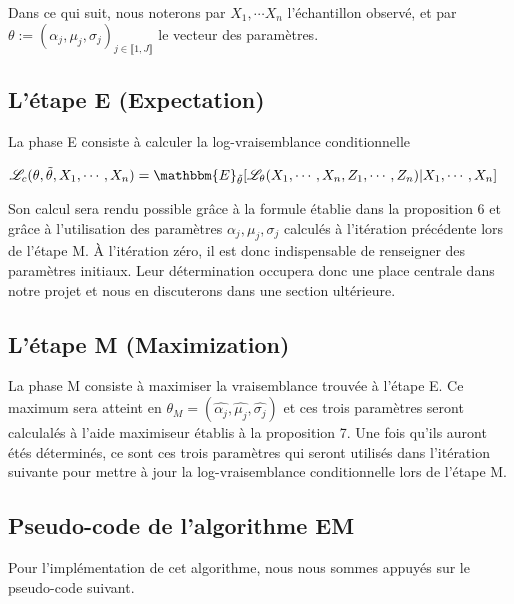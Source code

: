 \documentclass[frenchb]{report}
\newcommand{\1}{\mathbbm{1}}
\newcommand{\E}{\mathbbm{E}}
\newcommand{\lv}{\mathcal{L}}
\newcommand{\thetat}{\tilde{\theta}}
\theoremstyle{definition}\newtheorem{defn}{Définition}
\theoremstyle{definition}\newtheorem{exm}{Exemple}
\theoremstyle{definition}\newtheorem{nota}{Notation}
\theoremstyle{definition}\newtheorem{rem}{Remarque}
\begin{document}
Dans ce qui suit, nous noterons par $X_1,\cdots X_n$ l'échantillon observé, et par $\theta := (\alpha_j, \mu_j, \sigma_j)_{j\in\llbracket 1,J \rrbracket}$ le vecteur des paramètres.

\subsection{L'étape E (Expectation)}
La phase E consiste à calculer la log-vraisemblance conditionnelle 
\begin{center}
$\lv_{c}(\theta, \thetat, X_1, \cdots, X_n) = \E_{\thetat}[\lv_\theta(X_1, \cdots, X_n, Z_1, \cdots, Z_n) | X_1, \cdots, X_n]$
\end{center}
Son calcul sera rendu possible grâce à la formule établie dans la proposition 6 et grâce à l'utilisation des paramètres $\alpha_j, \mu_j, \sigma_j$ calculés à l'itération précédente lors de l'étape M. À l'itération zéro, il est donc indispensable de renseigner des paramètres initiaux. Leur détermination occupera donc une place centrale dans notre projet et nous en discuterons dans une section ultérieure.

\subsection{L'étape M (Maximization)}
La phase M consiste à maximiser la vraisemblance trouvée à l'étape E. Ce maximum sera atteint en $\theta_M = (\widehat{\alpha_j}, \widehat{\mu_j}, \widehat{\sigma_j})$ et ces trois paramètres seront calculalés à l'aide maximiseur établis à la proposition 7. Une fois qu'ils auront étés déterminés, ce sont ces trois paramètres qui seront utilisés dans l'itération suivante pour mettre à jour la log-vraisemblance conditionnelle lors de l'étape M.


\subsection{Pseudo-code de l'algorithme EM}
Pour l'implémentation de cet algorithme, nous nous sommes appuyés sur le pseudo-code suivant.
\end{document}
